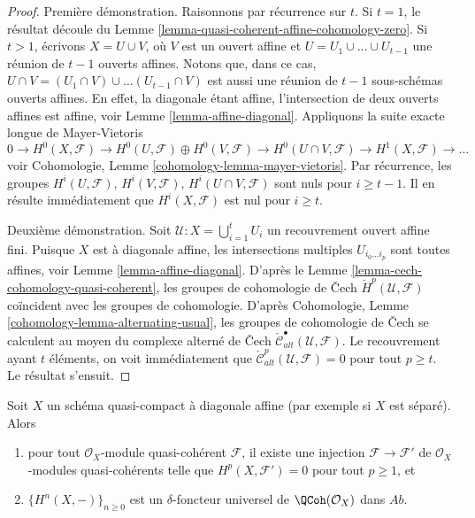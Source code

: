 \begin{proof}
Première démonstration.
Raisonnons par récurrence sur $t$.
Si $t = 1$, le résultat découle du
Lemme \ref{lemma-quasi-coherent-affine-cohomology-zero}.
Si $t > 1$, écrivons $X = U \cup V$, où $V$ est un ouvert affine et
$U = U_1 \cup \ldots \cup U_{t - 1}$ une réunion de $t - 1$ ouverts affines.
Notons que, dans ce cas,
$U \cap V =  (U_1 \cap V) \cup \ldots (U_{t - 1} \cap V)$
est aussi une réunion de $t - 1$ sous-schémas ouverts affines.
En effet, la diagonale étant affine, l'intersection de deux
ouverts affines est affine, voir Lemme \ref{lemma-affine-diagonal}.
Appliquons la suite exacte longue de Mayer-Vietoris
$$
0 \to
H^0(X, \mathcal{F}) \to
H^0(U, \mathcal{F}) \oplus H^0(V, \mathcal{F}) \to
H^0(U \cap V, \mathcal{F}) \to
H^1(X, \mathcal{F}) \to \ldots
$$
voir Cohomologie, Lemme \ref{cohomology-lemma-mayer-vietoris}.
Par récurrence, les groupes $H^i(U, \mathcal{F})$,
$H^i(V, \mathcal{F})$, $H^i(U \cap V, \mathcal{F})$ sont nuls pour
$i \geq t - 1$. Il en résulte immédiatement que $H^i(X, \mathcal{F})$
est nul pour $i \geq t$.

\medskip\noindent
Deuxième démonstration.
Soit $\mathcal{U} : X = \bigcup_{i = 1}^t U_i$ un recouvrement ouvert affine
fini. Puisque $X$ est à diagonale affine, les intersections multiples
$U_{i_0 \ldots i_p}$ sont toutes affines, voir
Lemme \ref{lemma-affine-diagonal}.
D'après le Lemme \ref{lemma-cech-cohomology-quasi-coherent}, les groupes de cohomologie de {\v C}ech
$\check{H}^p(\mathcal{U}, \mathcal{F})$
coïncident avec les groupes de cohomologie. D'après
Cohomologie, Lemme \ref{cohomology-lemma-alternating-usual},
les groupes de cohomologie de {\v C}ech se calculent au moyen du complexe
alterné de {\v C}ech $\check{\mathcal{C}}_{alt}^\bullet(\mathcal{U}, \mathcal{F})$.
Le recouvrement ayant $t$ éléments, on voit immédiatement
que $\check{\mathcal{C}}_{alt}^p(\mathcal{U}, \mathcal{F}) = 0$
pour tout $p \geq t$. Le résultat s'ensuit.
\end{proof}

\begin{lemma}
\label{lemma-affine-diagonal-universal-delta-functor}
Soit $X$ un schéma quasi-compact à diagonale affine
(par exemple si $X$ est séparé). Alors
\begin{enumerate}
\item pour tout $\mathcal{O}_X$-module quasi-cohérent $\mathcal{F}$,
il existe une injection $\mathcal{F} \to \mathcal{F}'$ de
$\mathcal{O}_X$-modules quasi-cohérents
telle que $H^p(X, \mathcal{F}') = 0$ pour tout $p \geq 1$, et
\item $\{H^n(X, -)\}_{n \geq 0}$
est un $\delta$-foncteur universel de $\QCoh(\mathcal{O}_X)$ dans
$\textit{Ab}$.
\end{enumerate}
\end{lemma}

